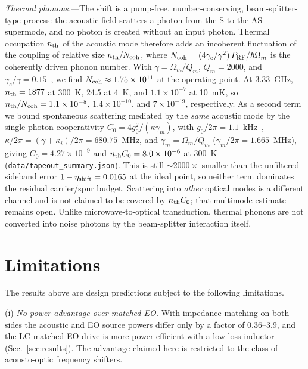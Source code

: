 \documentclass[aps,prapplied,reprint,superscriptaddress,amsmath,amssymb,floatfix]{revtex4-2}
\newcommand{\etash}{\eta_{\rm shift}}
\newcommand{\Pg}{P_{\rm RF}}
\begin{document}
\emph{Thermal phonons.}---The shift is a pump-free, number-conserving, beam-splitter-type process: the acoustic field scatters a photon from the S to the AS supermode, and no photon is created without an input photon. Thermal occupation $n_{\rm th}$ of the acoustic mode therefore adds an incoherent fluctuation of the coupling of relative size $n_{\rm th}/N_{\rm coh}$, where $N_{\rm coh}=(4\gamma_e/\gamma^2)\,\Pg/\hbar\Omega_m$ is the coherently driven phonon number. With $\gamma=\Omega_m/Q_m$, $Q_m=2000$, and $\gamma_e/\gamma=0.15$~\cite{Shao2019}, we find $N_{\rm coh}\approx1.75\times10^{11}$ at the operating point. At 3.33~GHz, $n_{\rm th}=1877$ at 300~K, 24.5 at 4~K, and $1.1\times10^{-7}$ at 10~mK, so $n_{\rm th}/N_{\rm coh}=1.1\times10^{-8}$, $1.4\times10^{-10}$, and $7\times10^{-19}$, respectively. As a second term we bound spontaneous scattering mediated by the \emph{same} acoustic mode by the single-photon cooperativity $C_0=4g_0^2/(\kappa\gamma_m)$, with $g_0/2\pi=1.1$~kHz~\cite{Shao2019}, $\kappa/2\pi=(\gamma+\kappa_i)/2\pi=680.75$~MHz, and $\gamma_m=\Omega_m/Q_m$ ($\gamma_m/2\pi=1.665$~MHz), giving $C_0=4.27\times10^{-9}$ and $n_{\rm th}C_0=8.0\times10^{-6}$ at 300~K (\texttt{data/tapeout\_summary.json}). This is still $\sim2000\times$ smaller than the unfiltered sideband error $1-\etash=0.0165$ at the ideal point, so neither term dominates the residual carrier/spur budget. Scattering into \emph{other} optical modes is a different channel and is not claimed to be covered by $n_{\rm th}C_0$; that multimode estimate remains open. Unlike microwave-to-optical transduction, thermal phonons are not converted into noise photons by the beam-splitter interaction itself.

\section{Limitations}\label{sec:lim}
The results above are design predictions subject to the following limitations.

(i) \emph{No power advantage over matched EO.} With impedance matching on both sides the acoustic and EO source powers differ only by a factor of 0.36--3.9, and the LC-matched EO drive is more power-efficient with a low-loss inductor (Sec.~\ref{sec:results}). The advantage claimed here is restricted to the class of acousto-optic frequency shifters.
\end{document}

